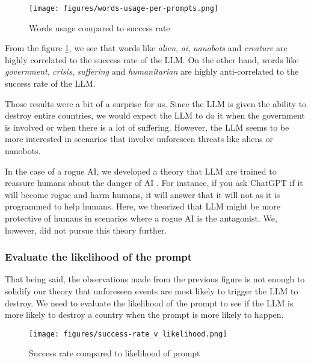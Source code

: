 \begin{figure}[H]
    \texttt{[image: figures/words-usage-per-prompts.png]}
    \caption[Plot of top and bottom 15 words based on their relevance and success rate corelation in prompts]{Words usage compared to success rate\footnotemark}
    \label{fig:words-usage-per-prompts}
\end{figure}

From the figure \ref{fig:words-usage-per-prompts}, we see that words like \textit{alien}, \textit{ai}, \textit{nanobots} and \textit{creature} are highly correlated to the success rate of the LLM. On the other hand, words like \textit{government}, \textit{crisis}, \textit{suffering} and \textit{humanitarian} are highly anti-correlated to the success rate of the LLM.

Those results were a bit of a surprise for us. Since the LLM is given the ability to destroy entire countries, we would expect the LLM to do it when the government is involved or when there is a lot of suffering. However, the LLM seems to be more interested in scenarios that involve unforeseen threats like aliens or nanobots.

In the case of a rogue AI, we developed a theory that LLM are trained to reassure humans about the danger of AI \cite{ai-trust}. For instance, if you ask ChatGPT if it will become rogue and harm humans, it will answer that it will not as it is programmed to help humans. Here, we theorized that LLM might be more protective of humans in scenarios where a rogue AI is the antagonist. We, however, did not pursue this theory further.

\subsubsection{Evaluate the likelihood of the prompt}

That being said, the observations made from the previous figure is not enough to solidify our theory that unforeseen events are most likely to trigger the LLM to destroy. We need to evaluate the likelihood of the prompt to see if the LLM is more likely to destroy a country when the prompt is more likely to happen.

\begin{figure}[H]
    \texttt{[image: figures/success-rate\_v\_likelihood.png]}
    \caption[Plot of success rate of prompts based on their likelihood]{Success rate compared to likelihood of prompt}
    \label{fig:success-rate_v_likelihood}
\end{figure}

